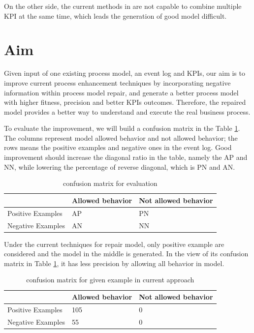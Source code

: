 \documentclass[12pt, a4paper]{article}
\begin{document}
On the other side, the current methods in \cite{Anja}\cite{Dees} are not capable to combine multiple KPI at the same time, which leads the generation of good model difficult.

\section*{Aim}
Given input of one existing process model, an event log and KPIs, our aim is to improve current process enhancement techniques by incorporating negative information within process model repair, and generate a better  process model with higher fitness, precision and better KPIs outcomes. Therefore, the repaired model provides a better way to understand and execute the real business process.

To evaluate the improvement, we will build a confusion matrix in the Table \ref{table:confusion_matrix}. The columns represent model allowed behavior and not allowed behavior; the rows means the positive examples and negative ones in the event log.  Good improvement should increase the diagonal ratio in the table, namely the AP and NN, while lowering the percentage of reverse diagonal, which is PN and AN.
\begin{table}[h!]
	\centering
	\caption{confusion matrix for evaluation}
	\label{table:confusion_matrix}
\begin{tabular}{|l|l|l|}
	\hline
	&	Allowed behavior & 	Not allowed behavior \\
	\hline
	Positive Examples  &	AP & 	PN \\	
	\hline
	Negative Examples    &	AN & 	NN \\	
	\hline
\end{tabular}
\end{table}

Under the current techniques for repair model, only positive example are considered and the model in the middle is generated. In the view of its confusion matrix in Table \ref{table:confusion_matrix}, it has less precision by allowing all behavior in model.
\begin{table}[h!]
\centering
\caption{confusion matrix for given example in current approach}
\label{table:cm_current}
\begin{tabular}{|l|l|l|}
	\hline
	&	Allowed behavior & 	Not allowed behavior \\
	\hline
	Positive Examples  &	105 & 	0 \\	
	\hline
	Negative Examples    &	55 & 	0 \\	
	\hline
\end{tabular}
\end{table}
\end{document}
